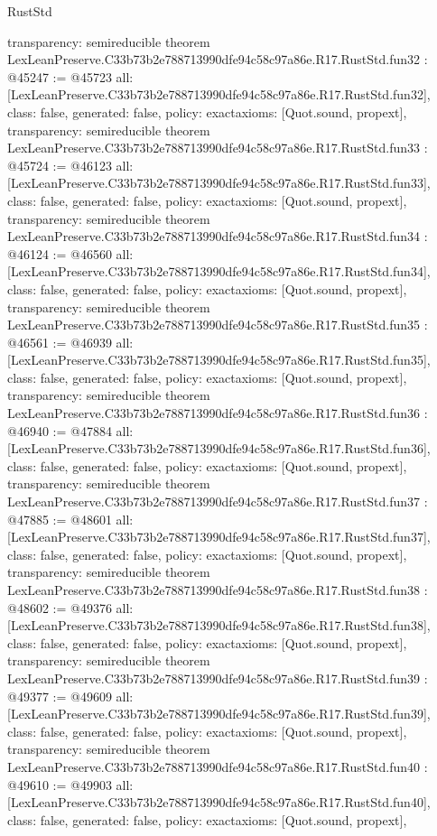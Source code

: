 \begin{lexlean}{RustStd}
\begin{coremodule}
{  transparency: semireducible
}
theorem LexLeanPreserve.C33b73b2e788713990dfe94c58c97a86e.R17.RustStd.fun32 : @45247 := @45723 {
  all: [LexLeanPreserve.C33b73b2e788713990dfe94c58c97a86e.R17.RustStd.fun32],
  class: false,
  generated: false,
  policy: exact{axioms: [Quot.sound, propext]},
  transparency: semireducible
}
theorem LexLeanPreserve.C33b73b2e788713990dfe94c58c97a86e.R17.RustStd.fun33 : @45724 := @46123 {
  all: [LexLeanPreserve.C33b73b2e788713990dfe94c58c97a86e.R17.RustStd.fun33],
  class: false,
  generated: false,
  policy: exact{axioms: [Quot.sound, propext]},
  transparency: semireducible
}
theorem LexLeanPreserve.C33b73b2e788713990dfe94c58c97a86e.R17.RustStd.fun34 : @46124 := @46560 {
  all: [LexLeanPreserve.C33b73b2e788713990dfe94c58c97a86e.R17.RustStd.fun34],
  class: false,
  generated: false,
  policy: exact{axioms: [Quot.sound, propext]},
  transparency: semireducible
}
theorem LexLeanPreserve.C33b73b2e788713990dfe94c58c97a86e.R17.RustStd.fun35 : @46561 := @46939 {
  all: [LexLeanPreserve.C33b73b2e788713990dfe94c58c97a86e.R17.RustStd.fun35],
  class: false,
  generated: false,
  policy: exact{axioms: [Quot.sound, propext]},
  transparency: semireducible
}
theorem LexLeanPreserve.C33b73b2e788713990dfe94c58c97a86e.R17.RustStd.fun36 : @46940 := @47884 {
  all: [LexLeanPreserve.C33b73b2e788713990dfe94c58c97a86e.R17.RustStd.fun36],
  class: false,
  generated: false,
  policy: exact{axioms: [Quot.sound, propext]},
  transparency: semireducible
}
theorem LexLeanPreserve.C33b73b2e788713990dfe94c58c97a86e.R17.RustStd.fun37 : @47885 := @48601 {
  all: [LexLeanPreserve.C33b73b2e788713990dfe94c58c97a86e.R17.RustStd.fun37],
  class: false,
  generated: false,
  policy: exact{axioms: [Quot.sound, propext]},
  transparency: semireducible
}
theorem LexLeanPreserve.C33b73b2e788713990dfe94c58c97a86e.R17.RustStd.fun38 : @48602 := @49376 {
  all: [LexLeanPreserve.C33b73b2e788713990dfe94c58c97a86e.R17.RustStd.fun38],
  class: false,
  generated: false,
  policy: exact{axioms: [Quot.sound, propext]},
  transparency: semireducible
}
theorem LexLeanPreserve.C33b73b2e788713990dfe94c58c97a86e.R17.RustStd.fun39 : @49377 := @49609 {
  all: [LexLeanPreserve.C33b73b2e788713990dfe94c58c97a86e.R17.RustStd.fun39],
  class: false,
  generated: false,
  policy: exact{axioms: [Quot.sound, propext]},
  transparency: semireducible
}
theorem LexLeanPreserve.C33b73b2e788713990dfe94c58c97a86e.R17.RustStd.fun40 : @49610 := @49903 {
  all: [LexLeanPreserve.C33b73b2e788713990dfe94c58c97a86e.R17.RustStd.fun40],
  class: false,
  generated: false,
  policy: exact{axioms: [Quot.sound, propext]},
}
\end{coremodule}
\end{lexlean}
